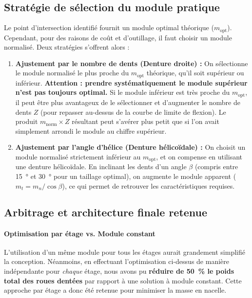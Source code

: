 \documentclass[11pt,a4paper]{article}
\begin{document}
\subsection{Stratégie de sélection du module pratique}

Le point d'intersection identifié fournit un module optimal théorique ($m_{\text{opt}}$). Cependant, pour des raisons de coût et d'outillage, il faut choisir un module normalisé. Deux stratégies s'offrent alors :

\begin{enumerate}
    \item \textbf{Ajustement par le nombre de dents (Denture droite) :} On sélectionne le module normalisé le plus proche du $m_{\text{opt}}$ théorique, qu'il soit supérieur ou inférieur. \textbf{Attention : prendre systématiquement le module supérieur n'est pas toujours optimal.} Si le module inférieur est très proche du $m_{\text{opt}}$, il peut être plus avantageux de le sélectionner et d'augmenter le nombre de dents $Z$ (pour repasser au-dessus de la courbe de limite de flexion). Le produit $m_{\text{norm}} \times Z$ résultant peut s'avérer plus petit que si l'on avait simplement arrondi le module au chiffre supérieur.
    \item \textbf{Ajustement par l'angle d'hélice (Denture hélicoïdale) :} On choisit un module normalisé strictement inférieur au $m_{\text{opt}}$, et on compense en utilisant une denture hélicoïdale. En inclinant les dents d'un angle $\beta$ (compris entre \qty{15}{\degree} et \qty{30}{\degree} pour un taillage optimal), on augmente le module apparent ($m_t = m_n / \cos\beta$), ce qui permet de retrouver les caractéristiques requises.
\end{enumerate}

\subsection{Arbitrage et architecture finale retenue}

\paragraph{Optimisation par étage vs. Module constant}
L'utilisation d'un même module pour tous les étages aurait grandement simplifié la conception. Néanmoins, en effectuant l'optimisation ci-dessus de manière indépendante pour \textit{chaque} étage, nous avons pu \textbf{réduire de \qty{50}{\percent} le poids total des roues dentées} par rapport à une solution à module constant. Cette approche par étage a donc été retenue pour minimiser la masse en nacelle.
\end{document}

